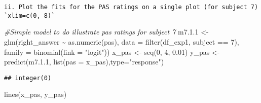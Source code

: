 \documentclass[
]{article}
\newenvironment{Shaded}{\begin{snugshade}}{\end{snugshade}}
\newcommand{\AttributeTok}[1]{\textcolor[rgb]{0.77,0.63,0.00}{#1}}
\newcommand{\CommentTok}[1]{\textcolor[rgb]{0.56,0.35,0.01}{\textit{#1}}}
\newcommand{\DecValTok}[1]{\textcolor[rgb]{0.00,0.00,0.81}{#1}}
\newcommand{\FloatTok}[1]{\textcolor[rgb]{0.00,0.00,0.81}{#1}}
\newcommand{\FunctionTok}[1]{\textcolor[rgb]{0.00,0.00,0.00}{#1}}
\newcommand{\NormalTok}[1]{#1}
\newcommand{\OtherTok}[1]{\textcolor[rgb]{0.56,0.35,0.01}{#1}}
\newcommand{\SpecialCharTok}[1]{\textcolor[rgb]{0.00,0.00,0.00}{#1}}
\newcommand{\StringTok}[1]{\textcolor[rgb]{0.31,0.60,0.02}{#1}}
\begin{document}
\begin{verbatim}
ii. Plot the fits for the PAS ratings on a single plot (for subject 7) `xlim=c(0, 8)`
\end{verbatim}

\begin{Shaded}
\begin{Highlighting}[]
\CommentTok{\#Simple model to do illustrate pas ratings for subject 7}
\NormalTok{m7.}\FloatTok{1.1} \OtherTok{\textless{}{-}} \FunctionTok{glm}\NormalTok{(right\_answer }\SpecialCharTok{\textasciitilde{}} \FunctionTok{as.numeric}\NormalTok{(pas), }\AttributeTok{data =} \FunctionTok{filter}\NormalTok{(df\_exp1, subject }\SpecialCharTok{==} \DecValTok{7}\NormalTok{), }\AttributeTok{family =} \FunctionTok{binomial}\NormalTok{(}\AttributeTok{link =} \StringTok{"logit"}\NormalTok{))}
\NormalTok{x\_pas }\OtherTok{\textless{}{-}} \FunctionTok{seq}\NormalTok{(}\DecValTok{0}\NormalTok{, }\DecValTok{4}\NormalTok{, }\FloatTok{0.01}\NormalTok{)}
\NormalTok{y\_pas }\OtherTok{\textless{}{-}} \FunctionTok{predict}\NormalTok{(m7.}\FloatTok{1.1}\NormalTok{, }\FunctionTok{list}\NormalTok{(}\AttributeTok{pas =}\NormalTok{ x\_pas),}\AttributeTok{type=}\StringTok{"response"}\NormalTok{)}
\end{Highlighting}
\end{Shaded}

\begin{Shaded}
\end{Shaded}

\begin{verbatim}
## integer(0)
\end{verbatim}

\begin{Shaded}
\begin{Highlighting}[]
\FunctionTok{lines}\NormalTok{(x\_pas, y\_pas)}
\end{Highlighting}
\end{Shaded}
\end{document}
